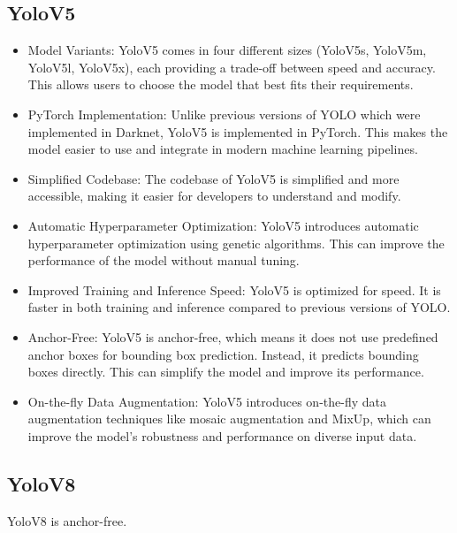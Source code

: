 \subsection{YoloV5}
\begin{itemize}
  \item Model Variants: YoloV5 comes in four different sizes (YoloV5s, YoloV5m, YoloV5l, YoloV5x), each providing a trade-off between speed and accuracy. This allows users to choose the model that best fits their requirements.
  \item PyTorch Implementation: Unlike previous versions of YOLO which were implemented in Darknet, YoloV5 is implemented in PyTorch. This makes the model easier to use and integrate in modern machine learning pipelines.
  \item Simplified Codebase: The codebase of YoloV5 is simplified and more accessible, making it easier for developers to understand and modify.
  \item Automatic Hyperparameter Optimization: YoloV5 introduces automatic hyperparameter optimization using genetic algorithms. This can improve the performance of the model without manual tuning.
  \item Improved Training and Inference Speed: YoloV5 is optimized for speed. It is faster in both training and inference compared to previous versions of YOLO.
  \item Anchor-Free: YoloV5 is anchor-free, which means it does not use predefined anchor boxes for bounding box prediction. Instead, it predicts bounding boxes directly. This can simplify the model and improve its performance.
  \item On-the-fly Data Augmentation: YoloV5 introduces on-the-fly data augmentation techniques like mosaic augmentation and MixUp, which can improve the model's robustness and performance on diverse input data.
\end{itemize}

\subsection{YoloV8}
YoloV8 is anchor-free.

